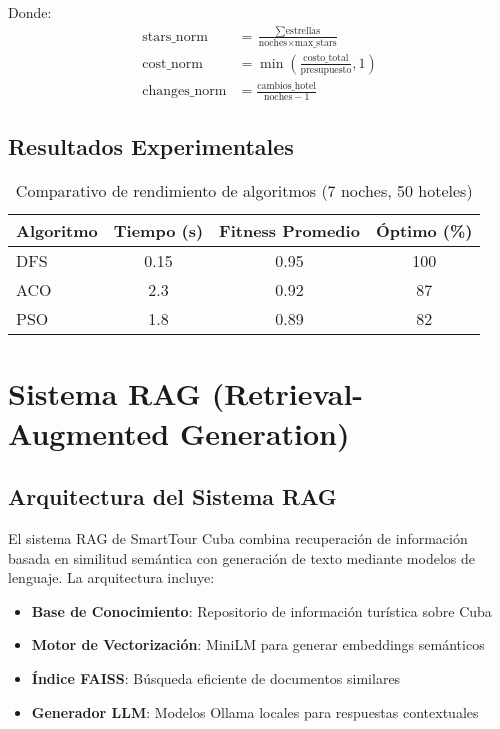 \documentclass[runningheads]{llncs}
\begin{document}
Donde:
\begin{align}
\text{stars\_norm} &= \frac{\sum \text{estrellas}}{\text{noches} \times \text{max\_stars}} \\
\text{cost\_norm} &= \min\left(\frac{\text{costo\_total}}{\text{presupuesto}}, 1\right) \\
\text{changes\_norm} &= \frac{\text{cambios\_hotel}}{\text{noches} - 1}
\end{align}

\subsection{Resultados Experimentales}

\begin{table}[H]
\centering
\begin{tabular}{lccc}
\toprule
\textbf{Algoritmo} & \textbf{Tiempo (s)} & \textbf{Fitness Promedio} & \textbf{Óptimo (\%)} \\
\midrule
DFS & 0.15 & 0.95 & 100 \\
ACO & 2.3 & 0.92 & 87 \\
PSO & 1.8 & 0.89 & 82 \\
\bottomrule
\end{tabular}
\caption{Comparativo de rendimiento de algoritmos (7 noches, 50 hoteles)}
\end{table}

\section{Sistema RAG (Retrieval-Augmented Generation)}

\subsection{Arquitectura del Sistema RAG}

El sistema RAG de SmartTour Cuba combina recuperación de información basada en similitud semántica con generación de texto mediante modelos de lenguaje. La arquitectura incluye:

\begin{itemize}
\item \textbf{Base de Conocimiento}: Repositorio de información turística sobre Cuba
\item \textbf{Motor de Vectorización}: MiniLM para generar embeddings semánticos
\item \textbf{Índice FAISS}: Búsqueda eficiente de documentos similares
\item \textbf{Generador LLM}: Modelos Ollama locales para respuestas contextuales
\end{itemize}
\end{document}
